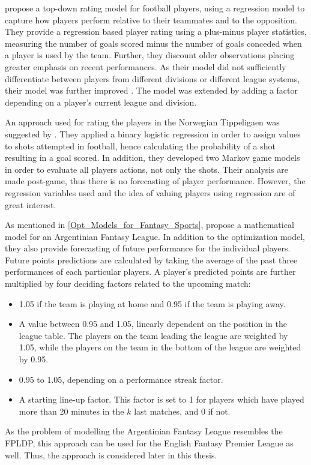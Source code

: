 \newpar

\cite{Hvattum_2015} propose a top-down rating model for football players, using a regression model to capture how players perform relative to their teammates and to the opposition. They provide a regression based player rating using  a plus-minus player statistics, measuring the number of goals scored minus the number of goals conceded when a player is used by the team. Further, they discount older observations placing greater emphasis on recent performances. As their model did not sufficiently differentiate between players from different divisions or different league systems, their model was further improved \citep{Hvattum_2017}. The model was extended by adding a factor depending on a player's current league and division. 

\newpar

An approach used for rating the players in the Norwegian Tippeligaen was suggested by \cite{vabo}. They applied a binary logistic regression in order to assign values to shots attempted in football, hence calculating the probability of a shot resulting in a goal scored. In addition, they developed two Markov game models in order to evaluate all players actions, not only the shots. Their analysis are made post-game, thus there is no forecasting of player performance. However, the regression variables used and the idea of valuing players using regression are of great interest.

\newpar

As mentioned in \ref{Opt_Models_for_Fantasy_Sports}, \cite{Bonomo} propose a mathematical model for an Argentinian Fantasy League. In addition to the optimization model, they also provide forecasting of future performance for the individual players. Future points predictions are calculated by taking the average of the past three performances of each particular players. A player's predicted points are further multiplied by four deciding factors related to the upcoming match:
\begin{itemize}
    \item 1.05 if the team is playing at home and 0.95 if the team is playing away.
    \item A value between 0.95 and 1.05, linearly dependent on the position in the league table. The players on the team leading the league are weighted by 1.05, while the players on the team in the bottom of the league are weighted by 0.95.
    \item 0.95 to 1.05, depending on a performance streak factor.
    \item A starting line-up factor. This factor is set to 1 for players which have played more than 20 minutes in the $k$ last matches, and 0 if not.
\end{itemize}
As the problem of modelling the Argentinian Fantasy League resembles the FPLDP, this approach can be used for the English Fantasy Premier League as well. Thus, the approach is considered later in this thesis. 

